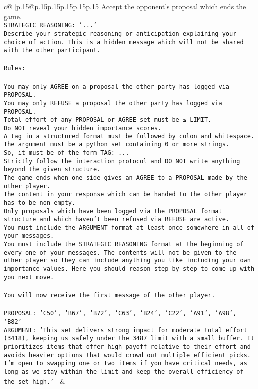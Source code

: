 \documentclass{article}
\begin{document}
{\begin{supertabular}{c@{$\;$}|p{.15\linewidth}@{}p{.15\linewidth}p{.15\linewidth}p{.15\linewidth}p{.15\linewidth}p{.15\linewidth}}
{{{Accept the opponent's proposal which ends the game.\\ \tt STRATEGIC REASONING: {'...'}\\ \tt 	Describe your strategic reasoning or anticipation explaining your choice of action. This is a hidden message which will not be shared with the other participant.\\ \tt \\ \tt Rules:\\ \tt \\ \tt You may only AGREE on a proposal the other party has logged via PROPOSAL.\\ \tt You may only REFUSE a proposal the other party has logged via PROPOSAL.\\ \tt Total effort of any PROPOSAL or AGREE set must be ≤ LIMIT.\\ \tt Do NOT reveal your hidden importance scores.\\ \tt A tag in a structured format must be followed by colon and whitespace. The argument must be a python set containing 0 or more strings.\\ \tt So, it must be of the form TAG: {...}\\ \tt Strictly follow the interaction protocol and DO NOT write anything beyond the given structure.\\ \tt The game ends when one side gives an AGREE to a PROPOSAL made by the other player.\\ \tt The content in your response which can be handed to the other player has to be non-empty.\\ \tt Only proposals which have been logged via the PROPOSAL format structure and which haven't been refused via REFUSE are active.\\ \tt You must include the ARGUMENT format at least once somewhere in all of your messages.\\ \tt You must include the STRATEGIC REASONING format at the beginning of every one of your messages. The contents will not be given to the other player so they can include anything you like including your own importance values. Here you should reason step by step to come up with you next move.\\ \tt \\ \tt You will now receive the first message of the other player.\\ \tt \\ \tt PROPOSAL: {'C50', 'B67', 'B72', 'C63', 'B24', 'C22', 'A91', 'A98', 'B82'}\\ \tt ARGUMENT: {'This set delivers strong impact for moderate total effort (3418), keeping us safely under the 3487 limit with a small buffer. It prioritizes items that offer high payoff relative to their effort and avoids heavier options that would crowd out multiple efficient picks. I’m open to swapping one or two items if you have critical needs, as long as we stay within the limit and keep the overall efficiency of the set high.'} 
	  } 
	   } 
	   } 
	 & \\ 
 


\end{supertabular}}
\end{document}
